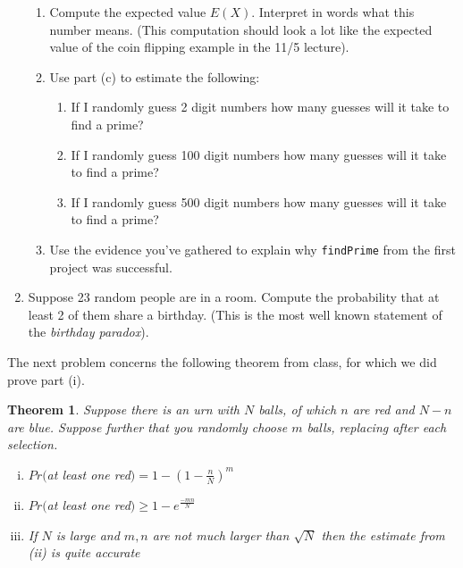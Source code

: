 \documentclass[11pt]{article}
\newtheorem{theorem}{Theorem}
\newcommand{\bZ}{\mathbb{Z}}
\begin{document}
\begin{enumerate}
{\begin{enumerate}
{    \[\Omega = \{n_1,n_2,n_3,\cdots | L< n_i\le U\text{ for all }i\}.\]
    Let $X:\Omega\to\bZ$ be the random variable whose value is number of guesses until the first prime.  That is:
    \[X(n_1n_2n_3...) = i\Longleftrightarrow n_i\text{ is prime and }n_j\text{ is not prime for any }j<i.\]
    Let $a$ be a positive integer.  Compute the probability density $f_X(i)$ in terms of $i$ and the probability $\rho$ from part (a).  (That is, what is the probability that the $i$th number is the first prime?)
    }
    \item{
    Compute the expected value $E(X)$.  Interpret in words what this number means.  (This computation should look a lot like the expected value of the coin flipping example in the 11/5 lecture).
    }
    \item{
    Use part (c) to estimate the following:
    \begin{enumerate}
      \item{If I randomly guess 2 digit numbers how many guesses will it take to find a prime?}
      \item{If I randomly guess 100 digit numbers how many guesses will it take to find a prime?}
      \item{If I randomly guess 500 digit numbers how many guesses will it take to find a prime?}
    \end{enumerate}
    }
    \item{
    Use the evidence you've gathered to explain why \verb|findPrime| from the first project was successful.
    }
  \end{enumerate}
  }
  \item{
  Suppose 23 random people are in a room.  Compute the probability that at least 2 of them share a birthday.  (This is the most well known statement of the \textit{birthday paradox}).
  }
\end{enumerate}
The next problem concerns the following theorem from class, for which we did prove part (i).
\begin{theorem}\label{collision}
  Suppose there is an urn with $N$ balls, of which $n$ are red and $N-n$ are blue.  Suppose further that you randomly choose $m$ balls, replacing after each selection.
  \begin{enumerate}[(i)]
    \item{
    $Pr($at least one red$) = 1-\left(1-\frac{n}{N}\right)^m$
    }
    \item{
    $Pr($at least one red$) \ge 1-e^{\frac{-mn}{N}}$
    }
    \item{
    If $N$ is large and $m,n$ are not much larger than $\sqrt N$ then the estimate from (ii) is quite accurate
    }
  \end{enumerate}
\end{theorem}
\end{document}
